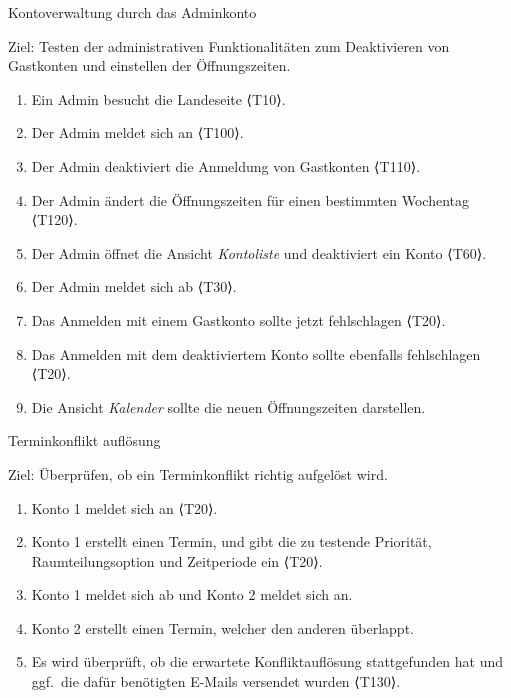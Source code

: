 \begin{scenario}{40}{Kontoverwaltung durch das Adminkonto}
  \item[Ziel:] Testen der administrativen Funktionalitäten zum Deaktivieren von Gastkonten und einstellen der Öffnungszeiten.
  \begin{enumerate}
    \item Ein Admin besucht die Landeseite ⟨T10⟩.
    \item Der Admin meldet sich an ⟨T100⟩.
    \item Der Admin deaktiviert die Anmeldung von Gastkonten ⟨T110⟩.
    \item Der Admin ändert die Öffnungszeiten für einen bestimmten Wochentag ⟨T120⟩.
    \item Der Admin öffnet die Ansicht \textit{Kontoliste} und deaktiviert ein Konto ⟨T60⟩.
    \item Der Admin meldet sich ab ⟨T30⟩.
    \item Das Anmelden mit einem Gastkonto sollte jetzt fehlschlagen ⟨T20⟩.
    \item Das Anmelden mit dem deaktiviertem Konto sollte ebenfalls fehlschlagen ⟨T20⟩.
    \item Die Ansicht \textit{Kalender} sollte die neuen Öffnungszeiten darstellen.
  \end{enumerate}
\end{scenario}

\begin{scenario}{50}{Terminkonflikt auflösung}
  \item[Ziel:] Überprüfen, ob ein Terminkonflikt richtig aufgelöst wird.
  \begin{enumerate}
    \item Konto 1 meldet sich an ⟨T20⟩.
    \item Konto 1 erstellt einen Termin, und gibt die zu testende Priorität, Raumteilungsoption und Zeitperiode ein ⟨T20⟩.
    \item Konto 1 meldet sich ab und Konto 2 meldet sich an.
    \item Konto 2 erstellt einen Termin, welcher den anderen überlappt.
    \item Es wird überprüft, ob die erwartete Konfliktauflösung stattgefunden hat und ggf.\ die dafür benötigten E-Mails versendet wurden ⟨T130⟩.
  \end{enumerate}
\end{scenario}
